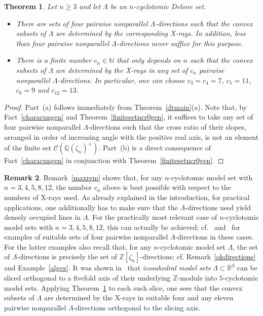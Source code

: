 \documentclass[a4paper]{amsart}
\newtheorem{theorem}{Theorem}[section]
\theoremstyle{definition}
\newtheorem{rem}[theorem]{Remark}
\numberwithin{equation}{section}
\numberwithin{theorem}{section}
\begin{document}
\begin{theorem}\label{dtmain2}
Let $n\geq 3$ and let $\varLambda$ be an $n$-cyclotomic Delone set.
\begin{itemize}
\item[(a)]
There are sets of four pairwise nonparallel $\varLambda$-directions
such that the convex subsets of $\varLambda$ are determined by the corresponding
X-rays. In addition, less than four pairwise nonparallel $\varLambda$-directions never
suffice for this purpose.
\item[(b)]
There is a finite number $c_n\in{\mathbb{N}}$ that only depends on $n$ such that the convex subsets of
$\varLambda$ are determined by the X-rays in any set of $c_n$
pairwise nonparallel $\varLambda$-directions. In particular, one can
choose $c_3=c_4=7$, $c_5=11$, $c_8=9$ and $c_{12}=13$. 
\end{itemize}
\end{theorem}
\begin{proof}
Part~(a) follows immediately from Theorem~\ref{dtmain}(a). Note that, by Fact~\ref{characungen} and
Theorem~\ref{finitesetncr0gen}, it suffices to take any set of four pairwise
nonparallel $\varLambda$-directions such that the cross ratio of their
slopes, arranged in order
of increasing angle with the positive real axis, is not an element of
the finite set $\mathcal{C}({\mathbb{Q}}(\zeta_n)^+)$. Part~(b) is a direct consequence of
Fact~\ref{characungen} in conjunction with 
Theorem~\ref{finitesetncr0gen}.
\end{proof}

\begin{rem}\label{rembest}
Remark~\ref{maxrem} shows that, for any $n$-cyclotomic
model set with $n=3,4,5,8,12$, the
number $c_n$ above is best possible with respect to the numbers of X-rays used. As already explained in the introduction, for practical applications, one additionally has to make sure that the
$\varLambda$-directions used yield densely occupied lines in
$\varLambda$. For the practically most relevant case of $n$-cyclotomic
model sets with $n=3,4,5,8,12$, this
can actually be achieved; cf.~\cite[Remark 5.8]{GG} and~\cite[Sec.~4]{H5} for examples of suitable sets of four pairwise nonparallel
$\varLambda$-directions in these cases. For the latter examples also recall that, for any $n$-cyclotomic model set $\varLambda$, the set of
$\varLambda$-directions is precisely the set
of ${\mathbb{Z}}[\zeta_n]$-directions; cf. Remark~\ref{okdirections} and
Example~\ref{algex}. It was shown in~\cite[Prop.~ 3.11]{H2} that {\em icosahedral model sets}
$\varLambda\subset{\mathbb{R}}^3$ can be sliced orthogonal to a fivefold axis of
their underlying ${\mathbb{Z}}$-module 
into $5$-cyclotomic model sets. Applying Theorem~\ref{dtmain2} to
each such slice, one sees that the convex subsets of $\varLambda$
are determined by the X-rays in suitable four and
any eleven pairwise
nonparallel $\varLambda$-directions orthogonal to
the slicing axis.    
\end{rem}
\end{document}
